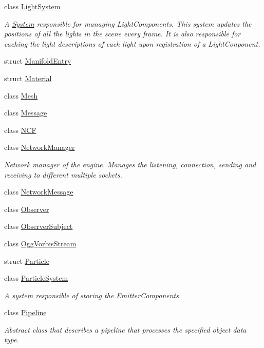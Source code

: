 \begin{DoxyCompactItemize}
class \hyperlink{class_blade_1_1_light_system}{Light\+System}
\begin{DoxyCompactList}\small\item\em A \hyperlink{class_blade_1_1_system}{System} responsible for managing Light\+Components. This system updates the positions of all the lights in the scene every frame. It is also responsible for caching the light descriptions of each light upon registration of a Light\+Conponent. \end{DoxyCompactList}\item 
struct \hyperlink{struct_blade_1_1_manifold_entry}{Manifold\+Entry}
\item 
struct \hyperlink{struct_blade_1_1_material}{Material}
\item 
class \hyperlink{class_blade_1_1_mesh}{Mesh}
\item 
class \hyperlink{class_blade_1_1_message}{Message}
\item 
class \hyperlink{class_blade_1_1_n_c_f}{N\+CF}
\item 
class \hyperlink{class_blade_1_1_network_manager}{Network\+Manager}
\begin{DoxyCompactList}\small\item\em Network manager of the engine. Manages the listening, connection, sending and receiving to different multiple sockets. \end{DoxyCompactList}\item 
class \hyperlink{class_blade_1_1_network_message}{Network\+Message}
\item 
class \hyperlink{class_blade_1_1_observer}{Observer}
\item 
class \hyperlink{class_blade_1_1_observer_subject}{Observer\+Subject}
\item 
class \hyperlink{class_blade_1_1_ogg_vorbis_stream}{Ogg\+Vorbis\+Stream}
\item 
struct \hyperlink{struct_blade_1_1_particle}{Particle}
\item 
class \hyperlink{class_blade_1_1_particle_system}{Particle\+System}
\begin{DoxyCompactList}\small\item\em A system responsible of storing the Emitter\+Components. \end{DoxyCompactList}\item 
class \hyperlink{class_blade_1_1_pipeline}{Pipeline}
\begin{DoxyCompactList}\small\item\em Abstract class that describes a pipeline that processes the specified object data type. \end{DoxyCompactList}\item 

\end{DoxyCompactItemize}
